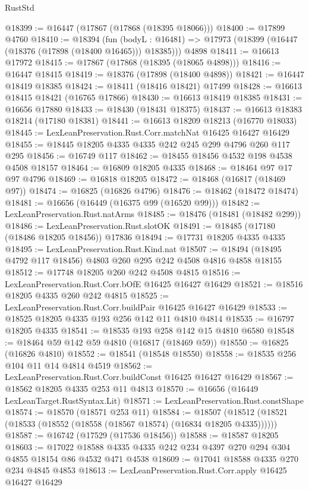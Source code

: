\begin{lexlean}{RustStd}
\begin{coremodule}
{\begin{coremodule}
{{{{{{{{{{{{{{{{{{{{{{{{{{{{{{{{{{{{{{{{{{{{{{{{{{{{{{{@18399 := @16447 (@17867 (@17868 (@18395 @18066)))
@18400 := @17899 @4760
@18410 := @18394
    (fun (bodyL : @16481) => @17973 (@18399 (@16447 (@18376 (@17898 (@18400 @16465))) @18385)))
    @4898
@18411 := @16613 @17972
@18415 := @17867 (@17868 (@18395 (@18065 @4898)))
@18416 := @16447 @18415
@18419 := @18376 (@17898 (@18400 @4898))
@18421 := @16447 @18419 @18385
@18424 := @18411 (@18416 @18421) @17499
@18428 := @16613 @18415 @18421 (@16765 @17866)
@18430 := @16613 @18419 @18385
@18431 := @16656 @17880
@18433 := @18430 (@18431 @18375)
@18437 := @16613 @18383 @18214 (@17180 @18381)
@18441 := @16613 @18209 @18213 (@16770 @18033)
@18445 := LexLeanPreservation.Rust.Corr.matchNat @16425 @16427 @16429
@18455 := @18445 @18205 @4335 @4335 @242 @245 @299 @4796 @260 @117 @295
@18456 := @16749 @117
@18462 := @18455 @18456 @4532 @198 @4538 @4508 @18157
@18464 := @16809 @18205 @4335
@18468 := @18464 @97 @17 @97 @4796
@18469 := @16818 @18205
@18472 := @18468 (@16817 (@18469 @97))
@18474 := @16825 (@16826 @4796)
@18476 := @18462 (@18472 @18474)
@18481 := @16656 (@16449 (@16375 @99 (@16520 @99)))
@18482 := LexLeanPreservation.Rust.natArms
@18485 := @18476 (@18481 (@18482 @299))
@18486 := LexLeanPreservation.Rust.slotOK
@18491 := @18485 (@17180 (@18486 @18205 @18456)) @17836
@18494 := @17731 @18205 @4335 @4335
@18495 := LexLeanPreservation.Rust.Kind.nat
@18507 := @18494 (@18495 @4792 @117 @18456) @4803 @260 @295 @242 @4508 @4816 @4858 @18155
@18512 := @17748 @18205 @260 @242 @4508 @4815
@18516 := LexLeanPreservation.Rust.Corr.bOfE @16425 @16427 @16429
@18521 := @18516 @18205 @4335 @260 @242 @4815
@18525 := LexLeanPreservation.Rust.Corr.buildPair @16425 @16427 @16429
@18533 := @18525 @18205 @4335 @193 @256 @142 @11 @4810 @4814
@18535 := @16797 @18205 @4335
@18541 := @18535 @193 @258 @142 @15 @4810 @6580
@18548 := @18464 @59 @142 @59 @4810 (@16817 (@18469 @59))
@18550 := @16825 (@16826 @4810)
@18552 := @18541 (@18548 @18550)
@18558 := @18535 @256 @104 @11 @14 @4814 @4519
@18562 := LexLeanPreservation.Rust.Corr.buildConst @16425 @16427 @16429
@18567 := @18562 @18205 @4335 @253 @11 @4813
@18570 := @16656 (@16449 LexLeanTarget.RustSyntax.Lit)
@18571 := LexLeanPreservation.Rust.constShape
@18574 := @18570 (@18571 @253 @11)
@18584 := @18507 (@18512 (@18521 (@18533 (@18552 (@18558 (@18567 @18574) (@16834 @18205 @4335))))))
@18587 := @16742 (@17529 (@17536 @18456))
@18588 := @18587 @18205
@18603 := @17022 @18588 @4335 @4335 @242 @234 @4397 @270 @294 @304 @4855 @18154 @86 @4532 @471 @4538
@18609 := @17041 @18588 @4335 @270 @234 @4845 @4853
@18613 := LexLeanPreservation.Rust.Corr.apply @16425 @16427 @16429
}}}}}}}}}}}}}}}}}}}}}}}}}}}}}}}}}}}}}}}}}}}}}}}}}}}}}}}
\end{coremodule}}
\end{coremodule}
\end{lexlean}
